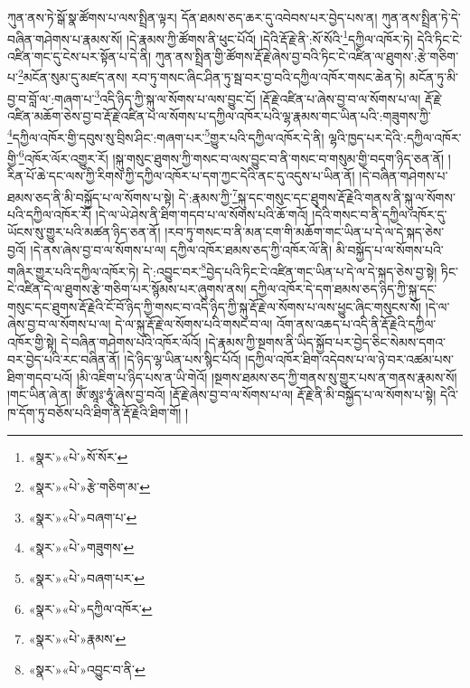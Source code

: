 ཀུན་ནས་ཏེ་སྒོ་སྣ་ཚོགས་པ་ལས་སྤྲིན་ལྟར། དོན་ཐམས་ཅད་ཆར་དུ་འབེབས་པར་བྱེད་པས་ན། ཀུན་ནས་སྤྲིན་ཏེ་དེ་བཞིན་གཤེགས་པ་རྣམས་སོ། །དེ་རྣམས་ཀྱི་ཚོགས་ནི་ཕུང་པོའོ། །དེའི་རྡོ་རྗེ་ནི་:སོ་སོའི་\footnote{«སྣར་»«པེ་»སོ་སོར་}དཀྱིལ་འཁོར་ཏེ། དེའི་ཏིང་ངེ་འཛིན་གང་དུ་ངེས་པར་སྟོན་པ་དེ་ནི། ཀུན་ནས་སྤྲིན་གྱི་ཚོགས་རྡོ་རྗེ་ཞེས་བྱ་བའི་ཏིང་ངེ་འཛིན་ལ་ཐུགས་:རྩེ་གཅིག་པ་\footnote{«སྣར་»«པེ་»རྩེ་གཅིག་མ་}མངོན་སུམ་དུ་མཛད་ནས། རབ་ཏུ་གསང་ཞིང་ཤིན་ཏུ་སྦ་བར་བྱ་བའི་དཀྱིལ་འཁོར་གསང་ཆེན་ཏེ། མངོན་ཏུ་མི་བྱ་བ་བློ་ལ་:གཞག་པ་\footnote{«སྣར་»«པེ་»བཞག་པ་}འདི་ཉིད་ཀྱི་སྐུ་ལ་སོགས་པ་ལས་བྱུང་ངོ། །རྡོ་རྗེ་འཛིན་པ་ཞེས་བྱ་བ་ལ་སོགས་པ་ལ། རྡོ་རྗེ་འཛིན་མཆོག་ཅེས་བྱ་བ་རྡོ་རྗེ་འཛིན་པ་ལ་སོགས་པ་དཀྱིལ་འཁོར་པའི་ལྷ་རྣམས་གང་ཡིན་པའི་:གཟུགས་ཀྱི་\footnote{«སྣར་»«པེ་»གཟུགས་}དཀྱིལ་འཁོར་གྱི་དབུས་སུ་བྲིས་ཤིང་:གཞག་པར་\footnote{«སྣར་»«པེ་»བཞག་པར་}གྱུར་པའི་དཀྱིལ་འཁོར་དེ་ནི། ལྷའི་ཁྱད་པར་དེའི་:དཀྱིལ་འཁོར་གྱི་\footnote{«སྣར་»«པེ་»དཀྱིལ་འཁོར་}འཁོར་ལོར་འགྱུར་རོ། །སྐུ་གསུང་ཐུགས་ཀྱི་གསང་བ་ལས་བྱུང་བ་ནི་གསང་བ་གསུམ་གྱི་བདག་ཉིད་ཅན་ནོ། །རིན་པོ་ཆེ་དང་ལས་ཀྱི་རིགས་ཀྱི་དཀྱིལ་འཁོར་པ་དག་ཀྱང་དེའི་ནང་དུ་འདུས་པ་ཡིན་ནོ། །དེ་བཞིན་གཤེགས་པ་ཐམས་ཅད་ནི་མི་བསྐྱོད་པ་ལ་སོགས་པ་སྟེ། དེ་:རྣམས་ཀྱི་\footnote{«སྣར་»«པེ་»རྣམས་}སྐུ་དང་གསུང་དང་ཐུགས་རྡོ་རྗེའི་གནས་ནི་སྐུ་ལ་སོགས་པའི་དཀྱིལ་འཁོར་རོ། །དེ་ལ་ཡེ་ཤེས་ནི་ཐིག་གདབ་པ་ལ་སོགས་པའི་ཆོ་གའོ། །དེའི་གསང་བ་ནི་དཀྱིལ་འཁོར་དུ་ཡོངས་སུ་གྱུར་པའི་མཚན་ཉིད་ཅན་ནོ། །རབ་ཏུ་གསང་བ་ནི་མན་ངག་གི་མཆོག་གང་ཡིན་པ་དེ་ལ་དེ་སྐད་ཅེས་བྱའོ། །དེ་ནས་ཞེས་བྱ་བ་ལ་སོགས་པ་ལ། དཀྱིལ་འཁོར་ཐམས་ཅད་ཀྱི་འཁོར་ལོ་ནི། མི་བསྐྱོད་པ་ལ་སོགས་པའི་གཞིར་གྱུར་པའི་དཀྱིལ་འཁོར་ཏེ། དེ་:འབྱུང་བར་\footnote{«སྣར་»«པེ་»འབྱུང་བ་ནི་}བྱེད་པའི་ཏིང་ངེ་འཛིན་གང་ཡིན་པ་དེ་ལ་དེ་སྐད་ཅེས་བྱ་སྟེ། ཏིང་ངེ་འཛིན་དེ་ལ་ཐུགས་རྩེ་གཅིག་པར་སྙོམས་པར་ཞུགས་ནས། དཀྱིལ་འཁོར་དེ་དག་ཐམས་ཅད་ཉིད་ཀྱི་སྐུ་དང་གསུང་དང་ཐུགས་རྡོ་རྗེའི་ངོ་བོ་ཉིད་ཀྱི་གསང་བ་འདི་ཉིད་ཀྱི་སྐུ་རྡོ་རྗེ་ལ་སོགས་པ་ལས་ཕྱུང་ཞིང་གསུངས་སོ། །དེ་ལ་ཞེས་བྱ་བ་ལ་སོགས་པ་ལ། དེ་ལ་སྐུ་རྡོ་རྗེ་ལ་སོགས་པའི་གསང་བ་ལ། འོག་ནས་འཆད་པ་འདི་ནི་རྡོ་རྗེའི་དཀྱིལ་འཁོར་གྱི་སྟེ། དེ་བཞིན་གཤེགས་པའི་འཁོར་ལོའོ། །དེ་རྣམས་ཀྱི་སྔགས་ནི་ཡིད་སྐྱོབ་པར་བྱེད་ཅིང་སེམས་དགའ་བར་བྱེད་པའི་རང་བཞིན་ནོ། །དེ་ཉིད་ལྷ་ཡིན་པས་སྙིང་པོའོ། །དཀྱིལ་འཁོར་ཐིག་འདེབས་པ་ལ་ཉེ་བར་འཚམ་པས་ཐིག་གདབ་པའོ། །མི་འཇིག་པ་ཉིད་པས་ན་ཡི་གེའོ། །སྔགས་ཐམས་ཅད་ཀྱི་གནས་སུ་གྱུར་པས་ན་གནས་རྣམས་སོ། །གང་ཡིན་ཞེ་ན། ཨོཾ་ཨཱཿ་ཧཱུཾ་ཞེས་བྱ་བའོ། །རྡོ་རྗེ་ཞེས་བྱ་བ་ལ་སོགས་པ་ལ། རྡོ་རྗེ་ནི་མི་བསྐྱོད་པ་ལ་སོགས་པ་སྟེ། དེའི་ཁ་དོག་ཏུ་བཅོས་པའི་ཐིག་ནི་རྡོ་རྗེའི་ཐིག་གོ། །
